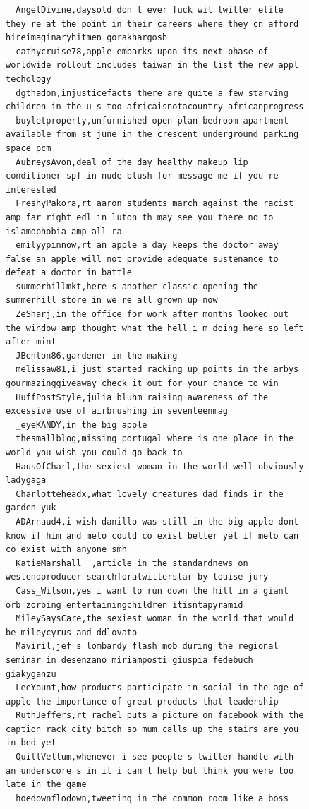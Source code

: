 \begin{figure}[htpb]
\begin{verbatim}
  AngelDivine,daysold don t ever fuck wit twitter elite they re at the point in their careers where they cn afford hireimaginaryhitmen gorakhargosh
  cathycruise78,apple embarks upon its next phase of worldwide rollout includes taiwan in the list the new appl techology
  dgthadon,injusticefacts there are quite a few starving children in the u s too africaisnotacountry africanprogress
  buyletproperty,unfurnished open plan bedroom apartment available from st june in the crescent underground parking space pcm
  AubreysAvon,deal of the day healthy makeup lip conditioner spf in nude blush for message me if you re interested
  FreshyPakora,rt aaron students march against the racist amp far right edl in luton th may see you there no to islamophobia amp all ra
  emilyypinnow,rt an apple a day keeps the doctor away false an apple will not provide adequate sustenance to defeat a doctor in battle
  summerhillmkt,here s another classic opening the summerhill store in we re all grown up now
  ZeSharj,in the office for work after months looked out the window amp thought what the hell i m doing here so left after mint
  JBenton86,gardener in the making
  melissaw81,i just started racking up points in the arbys gourmazinggiveaway check it out for your chance to win
  HuffPostStyle,julia bluhm raising awareness of the excessive use of airbrushing in seventeenmag
  _eyeKANDY,in the big apple
  thesmallblog,missing portugal where is one place in the world you wish you could go back to
  HausOfCharl,the sexiest woman in the world well obviously ladygaga
  Charlotteheadx,what lovely creatures dad finds in the garden yuk
  ADArnaud4,i wish danillo was still in the big apple dont know if him and melo could co exist better yet if melo can co exist with anyone smh
  KatieMarshall__,article in the standardnews on westendproducer searchforatwitterstar by louise jury
  Cass_Wilson,yes i want to run down the hill in a giant orb zorbing entertainingchildren itisntapyramid
  MileySaysCare,the sexiest woman in the world that would be mileycyrus and ddlovato
  Maviril,jef s lombardy flash mob during the regional seminar in desenzano miriamposti giuspia fedebuch giakyganzu
  LeeYount,how products participate in social in the age of apple the importance of great products that leadership
  RuthJeffers,rt rachel puts a picture on facebook with the caption rack city bitch so mum calls up the stairs are you in bed yet
  QuillVellum,whenever i see people s twitter handle with an underscore s in it i can t help but think you were too late in the game
  hoedownflodown,tweeting in the common room like a boss

\end{verbatim}
\end{figure}
